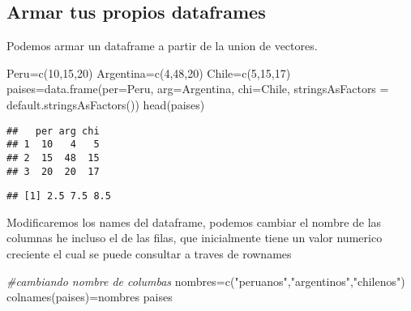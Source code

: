 \documentclass[
]{article}
\newenvironment{Shaded}{\begin{snugshade}}{\end{snugshade}}
\newcommand{\AttributeTok}[1]{\textcolor[rgb]{0.77,0.63,0.00}{#1}}
\newcommand{\CommentTok}[1]{\textcolor[rgb]{0.56,0.35,0.01}{\textit{#1}}}
\newcommand{\DecValTok}[1]{\textcolor[rgb]{0.00,0.00,0.81}{#1}}
\newcommand{\FunctionTok}[1]{\textcolor[rgb]{0.00,0.00,0.00}{#1}}
\newcommand{\NormalTok}[1]{#1}
\newcommand{\OtherTok}[1]{\textcolor[rgb]{0.56,0.35,0.01}{#1}}
\newcommand{\SpecialCharTok}[1]{\textcolor[rgb]{0.00,0.00,0.00}{#1}}
\newcommand{\StringTok}[1]{\textcolor[rgb]{0.31,0.60,0.02}{#1}}
\begin{document}
\hypertarget{armar-tus-propios-dataframes}{%
\subsection{Armar tus propios
dataframes}\label{armar-tus-propios-dataframes}}

Podemos armar un dataframe a partir de la union de vectores.

\begin{Shaded}
\begin{Highlighting}[]
\NormalTok{Peru}\OtherTok{=}\FunctionTok{c}\NormalTok{(}\DecValTok{10}\NormalTok{,}\DecValTok{15}\NormalTok{,}\DecValTok{20}\NormalTok{)}
\NormalTok{Argentina}\OtherTok{=}\FunctionTok{c}\NormalTok{(}\DecValTok{4}\NormalTok{,}\DecValTok{48}\NormalTok{,}\DecValTok{20}\NormalTok{)}
\NormalTok{Chile}\OtherTok{=}\FunctionTok{c}\NormalTok{(}\DecValTok{5}\NormalTok{,}\DecValTok{15}\NormalTok{,}\DecValTok{17}\NormalTok{)}
\NormalTok{paises}\OtherTok{=}\FunctionTok{data.frame}\NormalTok{(}\AttributeTok{per=}\NormalTok{Peru, }\AttributeTok{arg=}\NormalTok{Argentina, }\AttributeTok{chi=}\NormalTok{Chile,  }\AttributeTok{stringsAsFactors =} \FunctionTok{default.stringsAsFactors}\NormalTok{())}
\FunctionTok{head}\NormalTok{(paises)}
\end{Highlighting}
\end{Shaded}

\begin{verbatim}
##   per arg chi
## 1  10   4   5
## 2  15  48  15
## 3  20  20  17
\end{verbatim}

\begin{Shaded}
\end{Shaded}

\begin{verbatim}
## [1] 2.5 7.5 8.5
\end{verbatim}

Modificaremos los names del dataframe, podemos cambiar el nombre de las
columnas he incluso el de las filas, que inicialmente tiene un valor
numerico creciente el cual se puede consultar a traves de rownames

\begin{Shaded}
\begin{Highlighting}[]
\CommentTok{\#cambiando nombre de columbas}
\NormalTok{nombres}\OtherTok{=}\FunctionTok{c}\NormalTok{(}\StringTok{"peruanos"}\NormalTok{,}\StringTok{"argentinos"}\NormalTok{,}\StringTok{"chilenos"}\NormalTok{)}
\FunctionTok{colnames}\NormalTok{(paises)}\OtherTok{=}\NormalTok{nombres}
\NormalTok{paises}
\end{Highlighting}
\end{Shaded}
\end{document}
